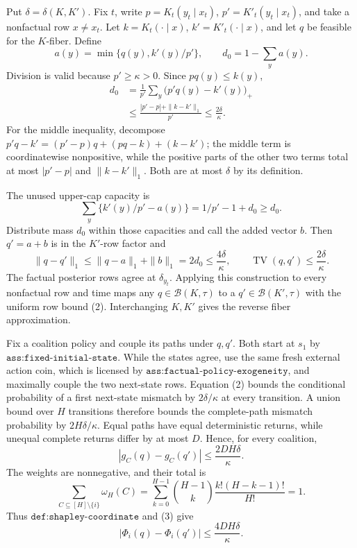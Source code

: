 Put \(\delta=\delta(K,K')\).  Fix \(t\), write \(p=K_t(y_t\mid x_t)\), \(p'=K'_t(y_t\mid x_t)\), and take a nonfactual row \(x\ne x_t\).  Let \(k=K_t(\cdot\mid x)\), \(k'=K'_t(\cdot\mid x)\), and let \(q\) be feasible for the \(K\)-fiber.  Define
\[
 a(y)=\min\{q(y),k'(y)/p'\},
 \qquad d_0=1-\sum_ya(y).
\]
Division is valid because \(p'\ge\kappa>0\).  Since \(pq(y)\le k(y)\),
\[
 \begin{aligned}
 d_0
 &=\frac1{p'}\sum_y\bigl(p'q(y)-k'(y)\bigr)_+\\
 &\le\frac{|p'-p|+\|k-k'\|_1}{p'}
 \le\frac{2\delta}{\kappa}.
 \end{aligned} \tag{1}
\]
For the middle inequality, decompose \(p'q-k'=(p'-p)q+(pq-k)+(k-k')\); the middle term is coordinatewise nonpositive, while the positive parts of the other two terms total at most \(|p'-p|\) and \(\|k-k'\|_1\).  Both are at most \(\delta\) by its definition.

The unused upper-cap capacity is
\[
 \sum_y\{k'(y)/p'-a(y)\}=1/p'-1+d_0\ge d_0.
\]
Distribute mass \(d_0\) within those capacities and call the added vector \(b\).  Then \(q'=a+b\) is in the \(K'\)-row factor and
\[
 \|q-q'\|_1\le\|q-a\|_1+\|b\|_1=2d_0
 \le\frac{4\delta}{\kappa},
 \qquad \operatorname{TV}(q,q')\le\frac{2\delta}{\kappa}. \tag{2}
\]
The factual posterior rows agree at \(\delta_{y_t}\).  Applying this construction to every nonfactual row and time maps any \(q\in\mathcal B(K,\tau)\) to a \(q'\in\mathcal B(K',\tau)\) with the uniform row bound (2).  Interchanging \(K,K'\) gives the reverse fiber approximation.

Fix a coalition policy and couple its paths under \(q,q'\).  Both start at \(s_1\) by \(\texttt{ass:fixed-initial-state}\).  While the states agree, use the same fresh external action coin, which is licensed by \(\texttt{ass:factual-policy-exogeneity}\), and maximally couple the two next-state rows.  Equation (2) bounds the conditional probability of a first next-state mismatch by \(2\delta/\kappa\) at every transition.  A union bound over \(H\) transitions therefore bounds the complete-path mismatch probability by \(2H\delta/\kappa\).  Equal paths have equal deterministic returns, while unequal complete returns differ by at most \(D\).  Hence, for every coalition,
\[
 |g_C(q)-g_C(q')|\le\frac{2DH\delta}{\kappa}. \tag{3}
\]
The weights are nonnegative, and their total is
\[
 \sum_{C\subseteq[H]\setminus\{i\}}\omega_H(C)
 =\sum_{k=0}^{H-1}{H-1\choose k}\frac{k!(H-k-1)!}{H!}=1. \tag{4}
\]
Thus \(\texttt{def:shapley-coordinate}\) and (3) give
\[
 |\Phi_i(q)-\Phi_i(q')|
 \le\frac{4DH\delta}{\kappa}. \tag{5}
\]

